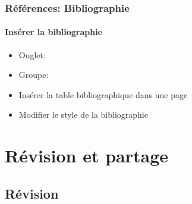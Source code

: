 \documentclass[xcolor=table]{beamer}
\begin{document}
\begin{frame}[t]
\frametitle{Références: Bibliographie}
\framesubtitle{Insérer la bibliographie}

\begin{minipage}{0.38\textwidth}
	\begin{itemize}
		\item Onglet: 
		\item Groupe: 
		\item Insérer la table bibliographique dans une page
		\item Modifier le style de la bibliographie
	\end{itemize}
\end{minipage}
\begin{minipage}{0.35\textwidth}
\end{minipage}
\begin{minipage}{0.25\textwidth}
	
\end{minipage}

\end{frame}

\section{Révision et partage}

%

\subsection{Révision}
\end{document}
